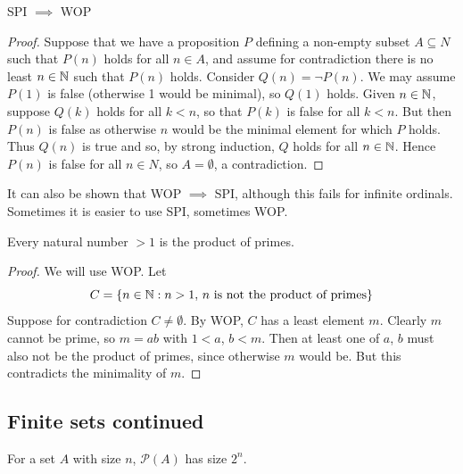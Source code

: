 \documentclass{../template/note}
\begin{document}
    \begin{proposition}
        SPI \(\implies\) WOP
    \end{proposition}
    
    \begin{proof}
        Suppose that we have a proposition \(P\) defining a non-empty subset \(A \subseteq N\) such that \(P(n)\) holds for all \(n \in A\), and assume for contradiction there is no least \(n \in \mathbb N\) such that \(P(n)\) holds. Consider \(Q(n) = \neg P(n)\). We may assume \(P(1)\) is false (otherwise 1 would be minimal), so \(Q(1)\) holds. Given \(n \in \mathbb N\), suppose \(Q(k)\) holds for all \(k < n\), so that \(P(k)\) is false for all \(k < n\). But then \(P(n)\) is false as otherwise \(n\) would be the minimal element for which \(P\) holds. Thus \(Q(n)\) is true and so, by strong induction, \(Q\) holds for all \(n \in \mathbb N\). Hence \(P(n)\) is false for all \(n \in N\), so \(A = \emptyset\), a contradiction.
    \end{proof}
    
    \begin{remark*}
        It can also be shown that WOP \(\implies\) SPI, although this fails for infinite ordinals. Sometimes it is easier to use SPI, sometimes WOP.
    \end{remark*}
    
    \begin{proposition}
        Every natural number \(>1\) is the product of primes.
        \label{fta-1}
    \end{proposition}
    
    \begin{proof}
        We will use WOP. Let
        \[
            C = \{n \in \mathbb N: n > 1,\, n \text{ is not the product of primes}\}
        \]
        Suppose for contradiction \(C \neq \emptyset\). By WOP, \(C\) has a least element \(m\). Clearly \(m\) cannot be prime, so \(m = ab\) with \(1 < a\), \(b < m\). Then at least one of \(a\), \(b\) must also not be the product of primes, since otherwise \(m\) would be. But this contradicts the minimality of \(m\).
    \end{proof}
    
    \subsection{Finite sets continued}

    \begin{proposition}
        For a set \(A\) with size \(n\), \(\mathcal P(A)\) has size \(2^n\).
    \end{proposition}
    
\end{document}
